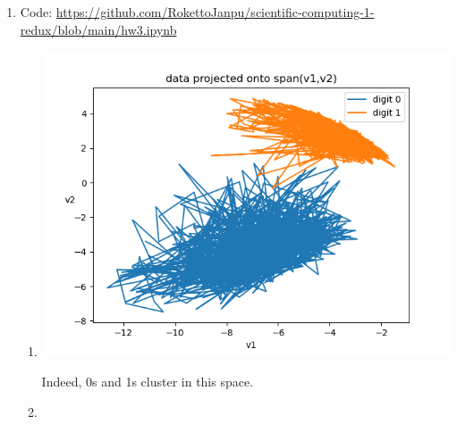 \documentclass{article}
\begin{document}
\begin{enumerate}
\begin{enumerate}
		
		
	\end{enumerate}
	
	
	
	\pagebreak
	
	
	
	\item Code: \url{https://github.com/RokettoJanpu/scientific-computing-1-redux/blob/main/hw3.ipynb}
	
	\begin{enumerate}
		
		
		
		\item 
		
		\begin{center}
			\includegraphics[scale=.7]{hw3 projection}
		\end{center}
		Indeed, 0s and 1s cluster in this space.
		
		
		
		\item
		

\end{enumerate}
\end{enumerate}
\end{document}

